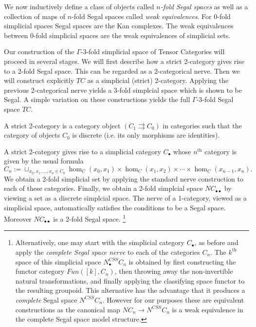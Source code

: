 \documentclass{amsart}
\begin{document}
 


	
	
	We now inductively define a class of objects called {\em $n$-fold Segal spaces} as well as a collection of maps of $n$-fold Segal spaces called {\em weak equivalences}. For $0$-fold simplicial spaces Segal spaces are the Kan complexes. The weak equivalences between $0$-fold simplicial spaces are the weak equivalences of simplicial sets.  
	

	


Our construction of the $\Gamma$-$3$-fold simplicial space of Tensor Categories will proceed in several stages. We will first describe how a strict 2-category gives rise to a 2-fold Segal space. This can be regarded as a 2-categorical nerve. Then we will construct explicitly $TC$ as a simplicial (strict) 2-category. Applying the previous 2-categorical nerve yields a 3-fold simplcial space which is shown to be Segal. A simple variation on these constructions yields the full $\Gamma$-3-fold Segal space $TC$. 

\begin{definition}
	A strict 2-category is a category object $(C_1 \rightrightarrows C_0)$ in categories such that the category of objects $C_0$ is discrete (i.e. its only morphisms are identities). 
\end{definition}

A strict 2-category gives rise to a simplicial category $C_\bullet$ whose $n^\textrm{th}$ category is given by the usual formula
\begin{equation*}
	C_n := \sqcup_{x_0, x_1, \dots, x_n \in C_0} \hom_C(x_0, x_1) \times \hom_C(x_1, x_2) \times \cdots \times \hom_C(x_{n-1}, x_n).
\end{equation*}
We obtain a 2-fold simplicial set by applying the standard nerve construction to each of these categories. Finally, we obtain a 2-fold simplcial space $NC_{\bullet \bullet}$ by viewing a set as a discrete simplcial space. The nerve of a 1-category, viewed as a simplicial space, automatically satisfies the conditions to be a Segal space. Moreover $NC_{\bullet \bullet}$ is a 2-fold Segal space. \footnote{Alternatively, one may start with the simplicial category $C_\bullet$, as before and apply the {\em complete Segal space nerve} to each of the categories $C_n$. The $k^\text{th}$ space of this simplicial space $N^{CSS}_\bullet C_n$ is obtained by first constructing the functor category $Fun([k], C_n)$, then throwing away the non-invertible natural transformations, and finally applying the classifying space functor to the resulting groupoid. This alternative has the advantage that it produces a {\em complete} Segal space $N^{CSS} C_n$. However for our purposes these are equivalent constructions as the canonical map $N C_n \to N^{CSS} C_n$ is a weak equivalence in the complete Segal space model structure. 
}
\end{document}

